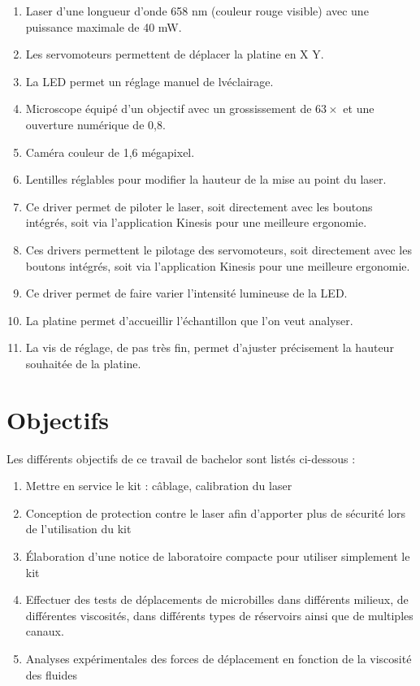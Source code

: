 \begin{enumerate}
    \item Laser d'une longueur d'onde 658 nm (couleur rouge visible) avec une puissance maximale de 40 mW.
    \item Les servomoteurs permettent de déplacer la platine en X Y.
    \item La LED permet un réglage manuel de lvéclairage.
    \item Microscope équipé d'un objectif avec un grossissement de $63\times$ et une ouverture numérique de 0,8.
    \item Caméra couleur de 1,6 mégapixel.
    \item Lentilles réglables pour modifier la hauteur de la mise au point du laser.
    \item Ce driver permet de piloter le laser, soit directement avec les boutons intégrés, soit via l'application Kinesis pour une meilleure ergonomie.
    \item Ces drivers permettent le pilotage des servomoteurs, soit directement avec les boutons intégrés, soit via l'application Kinesis pour une meilleure ergonomie.
    \item Ce driver permet de faire varier l'intensité lumineuse de la LED.
    \item La platine permet d'accueillir l'échantillon que l'on veut analyser.
    \item La vis de réglage, de pas très fin, permet d'ajuster précisement la hauteur souhaitée de la platine.
\end{enumerate}

\section{Objectifs}

Les différents objectifs de ce travail de bachelor sont listés ci-dessous :
\begin{enumerate}
    \item Mettre en service le kit : câblage, calibration du laser
    \item Conception de protection contre le laser afin d'apporter plus de sécurité lors de l'utilisation du kit
    \item Élaboration d'une notice de laboratoire compacte pour utiliser simplement le kit
    \item Effectuer des tests de déplacements de microbilles dans différents milieux, de différentes viscosités, dans différents types de réservoirs ainsi que de multiples canaux.
    \item Analyses expérimentales des forces de déplacement en fonction de la viscosité des fluides
\end{enumerate}

